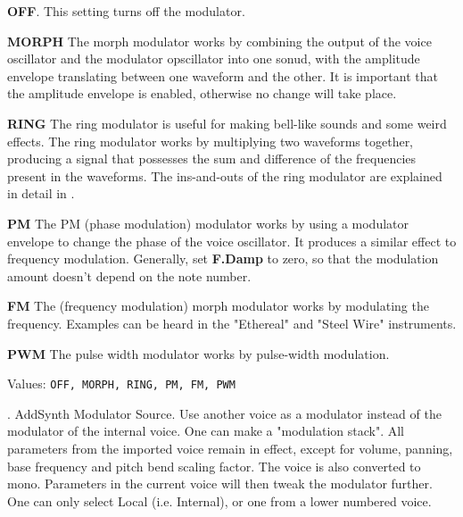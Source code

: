    \begin{enumber}
      \item \textbf{OFF}.
         This setting turns off the modulator.
      \item \textbf{MORPH}
         The morph modulator works by combining the output of the voice oscillator
         and the modulator opscillator into one sonud, with the amplitude envelope
         translating between one waveform and the other. It is important that the
         amplitude envelope is enabled, otherwise no change will take place.

      \item \textbf{RING}
         The ring modulator is useful for making bell-like sounds and some
         weird effects.  The ring modulator works by multiplying two
         waveforms together, producing a signal that possesses the sum and
         difference of the frequencies present in the waveforms.  The
         ins-and-outs of the ring modulator are explained in detail in
         .
      \item \textbf{PM}
         The PM (phase modulation) modulator works by using a modulator
         envelope to change the phase of the voice oscillator. It produces a
         similar effect to frequency modulation.
         Generally, set \textbf{F.Damp} to zero, so that the modulation amount
         doesn't depend on the note number.
      \item \textbf{FM}
         The (frequency modulation) morph modulator works by modulating the
         frequency.  Examples can be heard in the "Ethereal" and "Steel Wire"
         instruments.
      \item \textbf{PWM}
         The pulse width modulator works by pulse-width modulation.
   \end{enumber}

   Values: \texttt{OFF, MORPH, RING, PM, FM, PWM}


  .
  AddSynth Modulator Source.
  Use another voice as a modulator instead of the modulator of the internal
  voice. One can make a "modulation stack". All parameters from the imported
  voice remain in effect, except for volume, panning, base frequency and pitch
  bend scaling factor. The voice is also converted to mono. Parameters in the
  current voice will then tweak the modulator further.
  One can only select Local (i.e. Internal), or one from a lower numbered voice.

